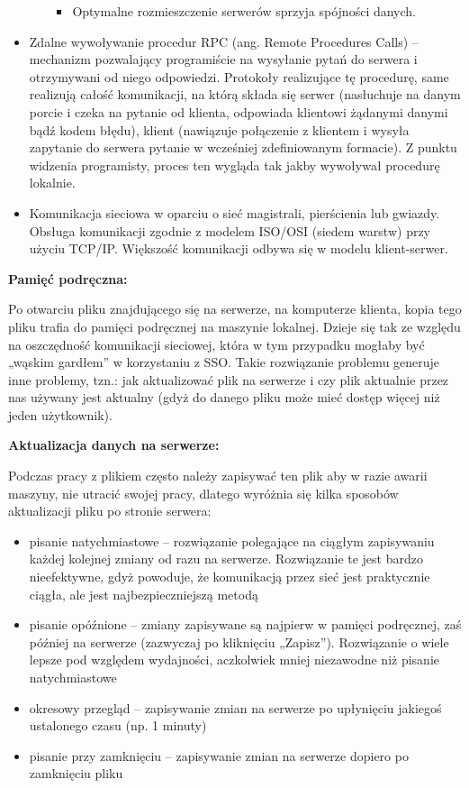 \begin{itemize}
\begin{itemize}
\begin{itemize}
			\item Optymalne rozmieszczenie serwerów sprzyja spójności danych.
		\end{itemize}
	\end{itemize}
	\item Zdalne wywoływanie procedur RPC (ang. Remote Procedures Calls) – mechanizm pozwalający programiście na wysyłanie pytań do serwera i otrzymywani od niego odpowiedzi. Protokoły realizujące tę procedurę, same realizują całość komunikacji, na którą składa się serwer (nasłuchuje na danym porcie i czeka na pytanie od klienta, odpowiada klientowi żądanymi danymi bądź kodem błędu), klient (nawiązuje połączenie z klientem i wysyła zapytanie do serwera pytanie w wcześniej zdefiniowanym formacie). Z punktu widzenia programisty, proces ten wygląda tak jakby wywoływał procedurę lokalnie.
	\item Komunikacja sieciowa w oparciu o sieć magistrali, pierścienia lub gwiazdy. Obsługa komunikacji zgodnie z modelem ISO/OSI (siedem warstw) przy użyciu TCP/IP. Większość komunikacji odbywa się w modelu klient-serwer.

\end{itemize}

\textbf{Pamięć podręczna:}

Po otwarciu pliku znajdującego się na serwerze, na komputerze klienta, kopia tego pliku trafia do pamięci podręcznej na maszynie lokalnej. Dzieje się tak ze względu na oszczędność komunikacji sieciowej, która w tym przypadku mogłaby być „wąskim gardłem” w korzystaniu z SSO. Takie rozwiązanie problemu generuje inne problemy, tzn.: jak aktualizować plik na serwerze i czy plik aktualnie przez nas używany jest aktualny (gdyż do danego pliku może mieć dostęp więcej niż jeden użytkownik).
 
\textbf{Aktualizacja danych na serwerze:}

Podczas pracy z plikiem często należy zapisywać ten plik aby w razie awarii maszyny, nie utracić swojej pracy, dlatego wyróżnia się kilka sposobów aktualizacji pliku po stronie serwera:
\begin{itemize}
	\item pisanie natychmiastowe – rozwiązanie polegające na ciągłym zapisywaniu każdej kolejnej zmiany od razu na serwerze. Rozwiązanie te jest bardzo nieefektywne, gdyż powoduje, że komunikacją przez sieć jest praktycznie ciągła, ale jest najbezpieczniejszą metodą
	\item pisanie opóźnione – zmiany zapisywane są najpierw w pamięci podręcznej, zaś później na serwerze (zazwyczaj po kliknięciu „Zapisz”). Rozwiązanie o wiele lepsze pod względem wydajności, aczkolwiek mniej niezawodne niż pisanie natychmiastowe
	\item okresowy przegląd – zapisywanie zmian na serwerze po upłynięciu jakiegoś ustalonego czasu (np. 1 minuty)
	\item pisanie przy zamknięciu – zapisywanie zmian na serwerze dopiero po zamknięciu pliku
\end{itemize}

